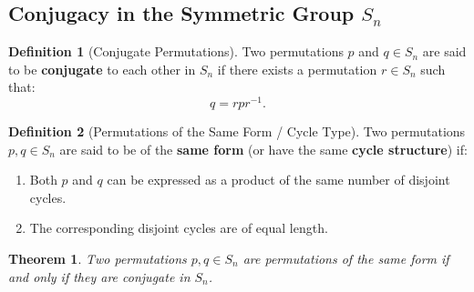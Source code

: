 \documentclass[12pt]{article}
\theoremstyle{definition}
\newtheorem{definition}{Definition}[section]
\theoremstyle{plain}
\newtheorem{theorem}{Theorem}[section]
\begin{document}
\subsection{Conjugacy in the Symmetric Group \texorpdfstring{$S_n$}{Sn}}

\begin{definition}[Conjugate Permutations]
Two permutations $p$ and $q \in S_n$ are said to be \textbf{conjugate} to each other in $S_n$ if there exists a permutation $r \in S_n$ such that:
\[
q = r p r^{-1}.
\]
\end{definition}

\begin{definition}[Permutations of the Same Form / Cycle Type]
Two permutations $p, q \in S_n$ are said to be of the \textbf{same form} (or have the same \textbf{cycle structure}) if:
\begin{enumerate}
    \item Both $p$ and $q$ can be expressed as a product of the same number of disjoint cycles.
    \item The corresponding disjoint cycles are of equal length.
\end{enumerate}
\end{definition}

\begin{theorem}
Two permutations $p, q \in S_n$ are permutations of the same form if and only if they are conjugate in $S_n$.
\end{theorem}
\end{document}
